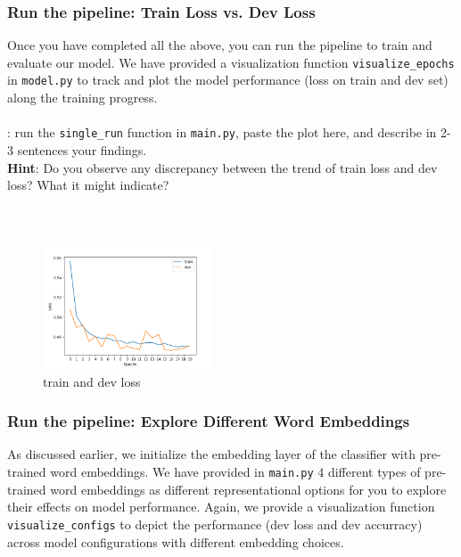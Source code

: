 \subsubsection{Run the pipeline: Train Loss vs. Dev Loss}
Once you have completed all the \todo{} above, you can run the pipeline to train and evaluate our model. We have provided a visualization function \texttt{visualize\_epochs} in \texttt{model.py} to track and plot the model performance (loss on train and dev set) along the training progress.\\\\
\noindent \todo{}: run the \texttt{single\_run} function in \texttt{main.py}, paste the plot here, and describe in 2-3 sentences your findings.\\
\noindent \textbf{Hint}: Do you observe any discrepancy between the trend of train loss and dev loss? What it might indicate?
\\\\
\noindent {\color{red}{your plots and answer:}}\\
 {}
\begin{figure}[h]
   \centering
   \includegraphics[width=0.45\textwidth]{single_run_loss.png}
   \caption{train and dev loss}
\end{figure}

\noindent{}

\subsubsection{Run the pipeline: Explore Different Word Embeddings}
As discussed earlier, we initialize the embedding layer of the classifier with pre-trained word embeddings. We have provided in \texttt{main.py} 4 different types of pre-trained word embeddings as different representational options for you to explore their effects on model performance. Again, we provide a visualization function \texttt{visualize\_configs} to depict the performance (dev loss and dev accurracy) across model configurations with different embedding choices. \\\\

